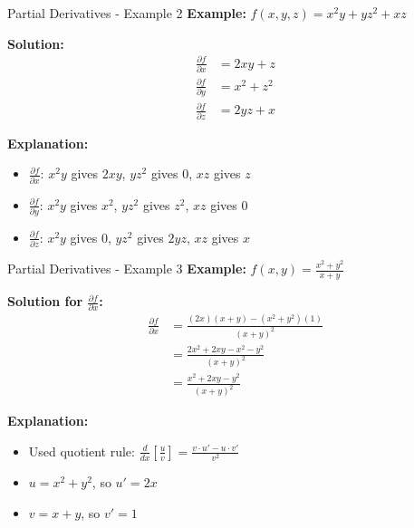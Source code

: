 \documentclass[aspectratio=169]{beamer}
\begin{document}
\begin{frame}{Partial Derivatives - Example 2}
\textbf{Example:} $f(x,y,z) = x^2y + yz^2 + xz$

\textbf{Solution:}
\begin{align*}
    \frac{\partial f}{\partial x} &= 2xy + z \\
    \frac{\partial f}{\partial y} &= x^2 + z^2 \\
    \frac{\partial f}{\partial z} &= 2yz + x
\end{align*}

\textbf{Explanation:}
\begin{itemize}
    \item $\frac{\partial f}{\partial x}$: $x^2y$ gives $2xy$, $yz^2$ gives $0$, $xz$ gives $z$
    \item $\frac{\partial f}{\partial y}$: $x^2y$ gives $x^2$, $yz^2$ gives $z^2$, $xz$ gives $0$
    \item $\frac{\partial f}{\partial z}$: $x^2y$ gives $0$, $yz^2$ gives $2yz$, $xz$ gives $x$
\end{itemize}
\end{frame}

\begin{frame}{Partial Derivatives - Example 3}
\textbf{Example:} $f(x,y) = \frac{x^2 + y^2}{x + y}$

\textbf{Solution for $\frac{\partial f}{\partial x}$:}
\begin{align*}
    \frac{\partial f}{\partial x} &= \frac{(2x)(x + y) - (x^2 + y^2)(1)}{(x + y)^2} \\
    &= \frac{2x^2 + 2xy - x^2 - y^2}{(x + y)^2} \\
    &= \frac{x^2 + 2xy - y^2}{(x + y)^2}
\end{align*}

\textbf{Explanation:}
\begin{itemize}
    \item Used quotient rule: $\frac{d}{dx}\left[\frac{u}{v}\right] = \frac{v \cdot u' - u \cdot v'}{v^2}$
    \item $u = x^2 + y^2$, so $u' = 2x$
    \item $v = x + y$, so $v' = 1$
\end{itemize}
\end{frame}
\end{document}
